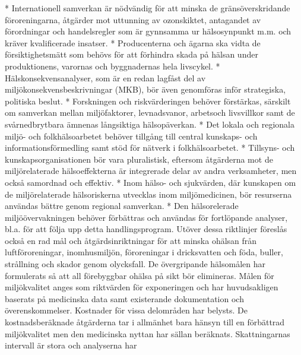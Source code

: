 * Internationell samverkan är nödvändig för att minska de gränsöverskridande föroreningarna, åtgärder mot uttunning av ozonskiktet, antagandet av förordningar och handelsregler som är gynnsamma ur hälsosynpunkt m.m. och kräver kvalificerade insatser.
* Producenterna och ägarna ska vidta de försiktighetsmätt som behövs för att förhindra skada på hälsan under produktionens, varornas och byggnadernas hela livscykel.
* Hälskonsekvensanalyser, som är en redan lagfåst del av miljökonsekvensbeskrivningar (MKB), bör även genomföras inför strategiska, politiska beslut.
* Forskningen och riskvärderingen behöver förstärkas, särskilt om samverkan mellan miljöfaktorer, levnadsvanor, arbetsoch livsvillkor samt de svårnedbrytbara ämnenas långsiktiga hälsopäverkan.
* Det lokala och regionala miljö- och folkhälsoarbetet behöver tillgång till central kunskaps- och informationsförmedling samt stöd för nätverk i folkhälsoarbetet.
* Tillsyns- och kunskapsorganisationen bör vara pluralistisk, eftersom åtgärderna mot de miljörelaterade hälsoeffekterna är integrerade delar av andra verksamheter, men också samordnad och effektiv.
* Inom hälso- och sjukvärden, där kunskapen om de miljörelaterade hälsoriskerna utvecklas inom miljömedicinen, bör resurserna användas bättre genom regional samverkan.
* Den hälsorelerade miljöövervakningen behöver förbättras och användas för fortlöpande analyser, bl.a. för att följa upp detta handlingsprogram.
Utöver dessa riktlinjer föreslås också en rad mål och åtgärdsinriktningar för att minska ohälsan från luftföroreningar, inomhusmiljön, föroreningar i dricksvatten och föda, buller, strållning och skador genom olycksfall.
De övergripande hälsomålen har formulerats så att all förebyggbar ohälsa på sikt bör elimineras. Målen för miljökvalitet anges som riktvärden för exponeringen och har huvudsakligen baserats på medicinska data samt existerande dokumentation och överenskommelser.
Kostnader för vissa delområden har belysts. De kostnadsberäknade åtgärderna tar i allmänhet bara hänsyn till en förbättrad miljökvalitet men den medicinska nyttan har sällan beräknats. Skattningarnas intervall är stora och analyserna har

